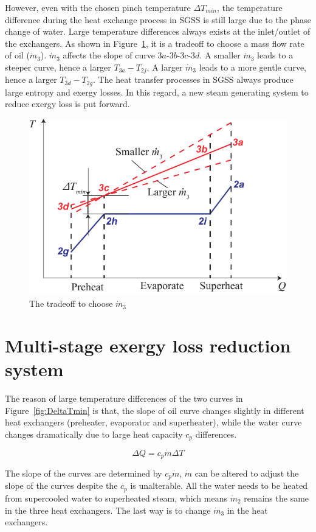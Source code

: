 However, even with the chosen pinch temperature $\Delta T_{min}$, the temperature difference during the heat exchange process in SGSS is still large due to the phase change of water. Large temperature differences always exists at the inlet/outlet of the exchangers. As shown in Figure~\ref{fig:DeltaT}, it is a tradeoff to choose a mass flow rate of oil ($\dot{m}_3$). $\dot{m}_3$ affects the slope of curve $3a$-$3b$-$3c$-$3d$. A smaller $\dot{m}_3$ leads to a steeper curve, hence a larger $T_{3a} - T_{2j}$. A larger $\dot{m}_3$ leads to a more gentle curve, hence a larger $T_{3d} - T_{2g}$. The heat transfer processes in SGSS always produce large entropy and exergy losses. In this regard, a new steam generating system to reduce exergy loss is put forward.

\noindent \begin{figure}[htbp]
\begin{center}
	\includegraphics[width = 0.7\columnwidth]{fig/DeltaT}
	\caption{The tradeoff to choose $\dot{m}_3$}
	\label{fig:DeltaT}
\end{center}
\end{figure}

\section{Multi-stage exergy loss reduction system}\label{sec:mers}
The reason of large temperature differences of the two curves in Figure~\ref{fig:DeltaTmin} is that, the slope of oil curve changes slightly in different heat exchangers (preheater, evaporator and superheater), while the water curve changes dramatically due to large heat capacity $c_p$ differences.

\begin{equation}
  \Delta Q =  c_p\dot{m} \Delta T
\end{equation}

The slope of the curves are determined by $c_p\dot{m}$, $\dot{m}$ can be altered to adjust the slope of the curves despite the $c_p$ is unalterable. All the water needs to be heated from supercooled water to superheated steam, which means $\dot{m}_2$ remains the same in the three heat exchangers. The last way is to change $\dot{m}_3$ in the heat exchangers.

